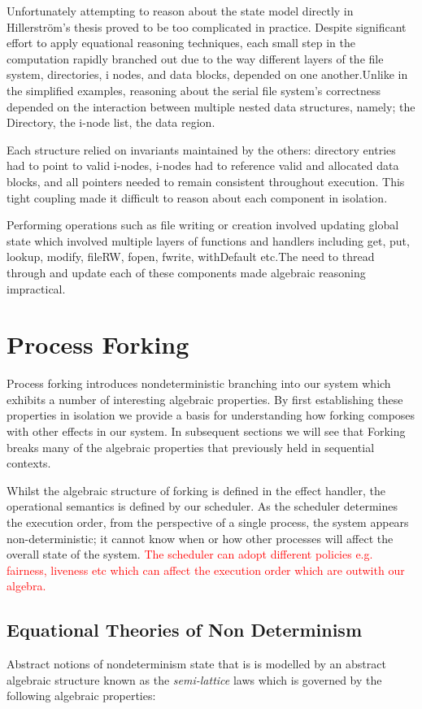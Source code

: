 \documentclass[logo,bsc,singlespacing,parskip]{infthesis}
\begin{document}
Unfortunately attempting to reason about the state model directly in Hillerström's thesis proved to be too complicated in practice. Despite significant effort to apply equational reasoning techniques, each small step in the computation rapidly branched out due to the way different layers of the file system, directories, i nodes, and data blocks, depended on one another.Unlike in the simplified examples, reasoning about the serial file system's correctness depended on the interaction between multiple nested data structures, namely; the Directory, the i-node list, the data region. 

Each structure relied on invariants maintained by the others: directory entries had to point to valid i-nodes, i-nodes had to reference valid and allocated data blocks, and all pointers needed to remain consistent throughout execution. This tight coupling made it difficult to reason about each component in isolation.

Performing operations such as file writing or creation involved updating global state which involved multiple layers of functions and handlers including get, put, lookup, modify, fileRW, fopen, fwrite, withDefault etc.The need to thread through and update each of these components made algebraic reasoning impractical.


\section{Process Forking}

Process forking introduces nondeterministic branching into our system which exhibits a number of interesting algebraic properties. By first establishing these properties in isolation we provide a basis for understanding how forking composes with other effects in our system. In subsequent sections we will see that Forking breaks many of the algebraic properties that previously held in sequential contexts.

Whilst the algebraic structure of forking is defined in the effect handler, the operational semantics is defined by our scheduler. As the scheduler determines the execution order, from the perspective of a single process, the system appears non-deterministic; it cannot know when or how other processes will affect the overall state of the system. \textcolor{red}{The scheduler can adopt different policies e.g. fairness, liveness etc which can affect the execution order which are outwith our algebra.}


\subsection{Equational Theories of Non Determinism}
Abstract notions of nondeterminism state that is is modelled by an abstract algebraic structure known as the \textit{semi-lattice} laws \cite{Pretnar:2010} which is governed by the following algebraic properties:
\end{document}
